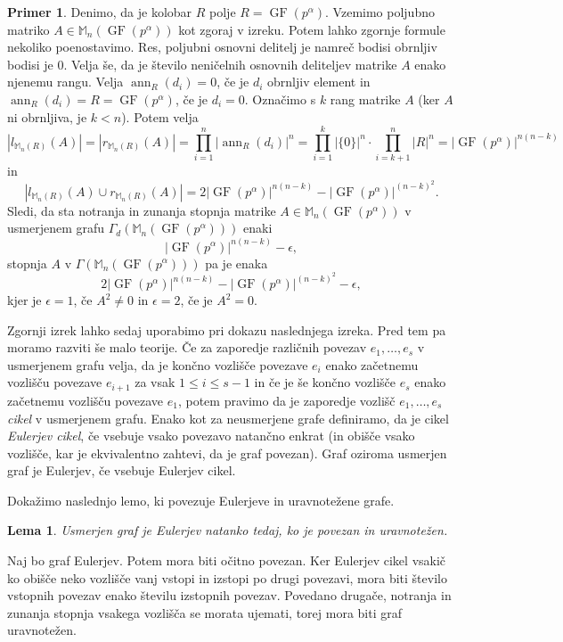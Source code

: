 \documentclass[a4paper, 12pt]{amsart}
\theoremstyle{definition} %
\newtheorem{primer}[definicija]{Primer}
\theoremstyle{plain} %
\newtheorem{lema}[definicija]{Lema}
\newcommand{\M}{\mathbb M}
\DeclareMathOperator{\ann}{ann}
\DeclareMathOperator{\GF}{GF}
\begin{document}
\begin{primer}
Denimo, da je kolobar $R$ polje $R=\GF(p^{\alpha})$. Vzemimo poljubno matriko $A\in \M_n(\GF(p^{\alpha}))$ kot zgoraj v izreku. Potem lahko zgornje formule nekoliko poenostavimo. Res, poljubni osnovni delitelj je namreč bodisi obrnljiv bodisi je 0. Velja še, da je število neničelnih osnovnih deliteljev matrike $A$ enako njenemu rangu. Velja $\ann_R(d_i) = 0$, če je $d_i$ obrnljiv element in $\ann_R(d_i) = R=\GF(p^{\alpha})$, če je $d_i=0$. Označimo s $k$ rang matrike $A$ (ker $A$ ni obrnljiva, je $k<n$). Potem velja 
$$
|l_{\M_n(R)}(A)| = |r_{\M_n(R)}(A)|=\prod_{i=1}^n|\ann_R(d_i)|^n = \prod_{i=1}^k |\{0\}|^n\cdot \prod_{i=k+1}^n |R|^{n} =|\GF(p^{\alpha})|^{n(n-k)}
$$
in
$$
|l_{\M_n(R)} (A) \cup r_{\M_n(R)}(A)| = 2|\GF(p^{\alpha})|^{n(n-k)} - |\GF(p^{\alpha})|^{(n-k)^2}.
$$
Sledi, da sta notranja in zunanja stopnja matrike $A\in \M_n(\GF(p^{\alpha}))$ v usmerjenem grafu $\Gamma_d(\M_n(\GF(p^{\alpha})))$ enaki 
$$
|\GF(p^{\alpha})|^{n(n-k)} - \epsilon,
$$
stopnja $A$ v $\Gamma (\M_n(\GF(p^{\alpha})))$ pa je enaka
$$
 2|\GF(p^{\alpha})|^{n(n-k)} - |\GF(p^{\alpha})|^{(n-k)^2} - \epsilon,
$$
kjer je $\epsilon=1$, če $A^2\neq 0$ in $\epsilon = 2$, če je $A^2 = 0$. 
\end{primer}

Zgornji izrek lahko sedaj uporabimo pri dokazu naslednjega izreka. Pred tem pa moramo razviti še malo teorije. Če za zaporedje različnih povezav $e_1, \dots, e_s$ v usmerjenem grafu velja, da je končno vozlišče povezave $e_i$ enako začetnemu vozlišču povezave $e_{i+1}$ za vsak $1 \le i \le s-1$ in če je še končno vozlišče $e_s$ enako začetnemu vozlišču povezave $e_1$, potem pravimo da je zaporedje vozlišč $e_1,\dots,e_s$ \emph{cikel} v usmerjenem grafu. Enako kot za neusmerjene grafe definiramo, da je cikel \emph{Eulerjev cikel}, če vsebuje vsako povezavo natančno enkrat (in obišče vsako vozlišče, kar je ekvivalentno zahtevi, da je graf povezan). Graf oziroma usmerjen graf je Eulerjev, če vsebuje Eulerjev cikel.

Dokažimo naslednjo lemo, ki povezuje Eulerjeve in uravnotežene grafe.
\begin{lema}
\label{usmerjenGrafEuler}
Usmerjen graf je Eulerjev natanko tedaj, ko je povezan in uravnotežen.
\end{lema}

\proof
Naj bo graf Eulerjev. Potem mora biti očitno povezan. Ker Eulerjev cikel vsakič ko obišče neko vozlišče vanj vstopi in izstopi po drugi povezavi, mora biti število vstopnih povezav enako številu izstopnih povezav. Povedano drugače, notranja in zunanja stopnja vsakega vozlišča se morata ujemati, torej mora biti graf uravnotežen.
\end{document}
